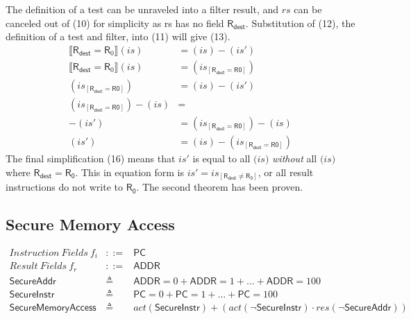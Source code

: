 \documentclass[12pt, letterpaper]{article}
\begin{document}
    The definition of a test can be unraveled into a filter result, and $\mathit{rs}$ can be canceled out of (10) for simplicity as rs has no field $\mathsf{R_{dest}}$.  Substitution of (12), the definition of a test and filter, into (11) will give (13).
\begin{align}
    \llbracket \mathsf{R}_{\mathsf{dest}} = \mathsf{R}_0 \rrbracket (\mathit{is})
    &=
    (\mathit{is}) - (\mathit{is}')
    \\
    \llbracket \mathsf{R}_{\mathsf{dest}} = \mathsf{R}_0 \rrbracket (\mathit{is})
    &=
    (\mathit{is_{[\mathsf{R_{dest}=R0}]}})
    \\
    (\mathit{is_{[\mathsf{R_{dest}=R0}]}})
    &=
    (\mathit{is}) - (\mathit{is}')
    \\
    (\mathit{is_{[\mathsf{R_{dest}=R0}]}}) - (\mathit{is}) 
    &=
    \\
    - (\mathit{is}')
    &=
    (\mathit{is_{[\mathsf{R_{dest}=R0}]}}) - (\mathit{is})
    \\
    (\mathit{is}')
    &=
    (\mathit{is}) - (\mathit{is_{[\mathsf{R_{dest}=R0}]}})
\end{align}
    The final simplification (16) means that $\mathit{is}'$ is equal to all $\mathit(is)$ \textit{without} all $\mathit(is)$ where $\mathsf{R_{dest}} = \mathsf{R_{0}}$.
    This in equation form is $\mathit{is}' = \mathit{is_{[\mathsf{R_{dest} \neq \mathsf{R_{0}}}]}}$, or all result instructions do not write to $\mathsf{R_{0}}$.  The second theorem has been proven.


\subsection{Secure Memory Access}

\[
\begin{array}{rcl}
  \mathit{Instruction\ Fields}\ f_i &::=& \mathsf{PC} \\
  \mathit{Result\ Fields}\ f_r &::=& \mathsf{ADDR} \\
  \mathsf{SecureAddr} &\triangleq& \mathsf{ADDR} = 0 + \mathsf{ADDR} = 1 + \ldots + \mathsf{ADDR} = 100 \\
  \mathsf{SecureInstr} &\triangleq& \mathsf{PC} = 0 + \mathsf{PC} = 1 + \ldots + \mathsf{PC} = 100 \\
  \mathsf{SecureMemoryAccess} &\triangleq&
    \mathit{act}(\mathsf{SecureInstr}) +
    (\mathit{act}(\neg\mathsf{SecureInstr}) \cdot
     \mathit{res}(\neg\mathsf{SecureAddr}))
     
\end{array}
\]
\end{document}
